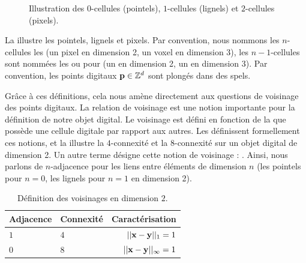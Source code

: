 \begin{figure}[ht]
  \begin{center}
    
    \caption{Illustration des $0$-cellules (pointels), $1$-cellules (lignels) et
    $2$-cellules (pixels).\label{fig:notations_topo}}
  \end{center}
\end{figure}

La  illustre les pointels, lignels et pixels. Par
convention, nous nommons les $n$-cellules les  (un pixel en
dimension 2, un voxel en dimension 3), les $n-1$-cellules sont nommées les
 ou  pour  (un
 en dimension 2, un  en dimension 3). Par
convention, les points digitaux $\mathbf{p} \in \mathbb{Z}^d$ sont plongés dans des
spels.


%
%
Grâce à ces définitions, cela nous amène directement aux questions de voisinage
des points digitaux. La relation de voisinage est une notion importante pour la
définition de notre objet digital. Le voisinage est défini en fonction de la
 que possède une cellule digitale par rapport aux autres.
Les  définissent formellement ces
notions, et la  illustre la $4$-connexité et la
$8$-connexité sur un objet digital de dimension 2. Un autre terme désigne cette
notion de voisinage : . Ainsi, nous parlons de
$n$-adjacence pour les liens entre éléments de dimension $n$ (\cad les pointels
pour $n=0$, les lignels pour $n=1$ en dimension 2).

\begin{table}[ht]
  \centering
  \caption{Définition des voisinages en dimension $2$.}
  \label{tab:adjacence2d}
    \renewcommand{\arraystretch}{1.1}
  \begin{tabular}{@{}llr@{}}
    \toprule
    Adjacence & Connexité  & Caractérisation \\ \midrule
    $1$ & $4$        & $||\mathbf{x} - \mathbf{y}||_1 = 1$ \\
    $0$ & $8$        & $||\mathbf{x} - \mathbf{y}||_\infty = 1$ \\
    \bottomrule
  \end{tabular}
\end{table}

